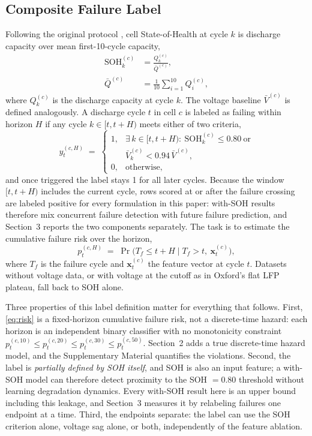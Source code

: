 \documentclass[11pt,a4paper]{article}
\begin{document}
\subsection{Composite Failure Label}
Following the original protocol \cite{shikdar2026learning}, cell State-of-Health at cycle $k$ is discharge capacity over mean first-10-cycle capacity,
\begin{equation}\label{eq:soh}
\begin{aligned}
\mathrm{SOH}_k^{(c)} &= \frac{Q_k^{(c)}}{\bar{Q}^{(c)}},\\[2pt]
\bar{Q}^{(c)} &= \frac{1}{10}\sum_{i=1}^{10} Q_i^{(c)},
\end{aligned}
\end{equation}
where $Q_k^{(c)}$ is the discharge capacity at cycle $k$. The voltage baseline $\bar{V}^{(c)}$ is defined analogously. A discharge cycle $t$ in cell $c$ is labeled as failing within horizon $H$ if any cycle $k\in[t,t{+}H)$ meets either of two criteria,
\begin{equation}\label{eq:label}
y_t^{(c,H)} \;=\; \begin{cases}
1, & \exists\, k\in[t,t{+}H):\ \mathrm{SOH}_k^{(c)}\le 0.80 \ \text{or}\\[2pt]
& \bar{V}_k^{(c)} < 0.94\,\bar{V}^{(c)},\\[2pt]
0, & \text{otherwise,}
\end{cases}
\end{equation}
and once triggered the label stays 1 for all later cycles. Because the window $[t,t{+}H)$ includes the current cycle, rows scored at or after the failure crossing are labeled positive for every formulation in this paper: with-SOH results therefore mix concurrent failure detection with future failure prediction, and Section~3 reports the two components separately. The task is to estimate the cumulative failure risk over the horizon,
\begin{equation}\label{eq:risk}
p_t^{(c,H)} \;=\; \Pr\!\bigl(T_f \le t{+}H \mid T_f > t,\ \mathbf{x}_t^{(c)}\bigr),
\end{equation}
where $T_f$ is the failure cycle and $\mathbf{x}_t^{(c)}$ the feature vector at cycle $t$. Datasets without voltage data, or with voltage at the cutoff as in Oxford's flat LFP plateau, fall back to SOH alone.

Three properties of this label definition matter for everything that follows. First, \eqref{eq:risk} is a fixed-horizon cumulative failure risk, not a discrete-time hazard: each horizon is an independent binary classifier with no monotonicity constraint $p_t^{(c,10)}\le p_t^{(c,20)}\le p_t^{(c,30)}\le p_t^{(c,50)}$. Section~2 adds a true discrete-time hazard model, and the Supplementary Material quantifies the violations. Second, the label is \emph{partially defined by SOH itself}, and SOH is also an input feature; a with-SOH model can therefore detect proximity to the SOH $=0.80$ threshold without learning degradation dynamics. Every with-SOH result here is an upper bound including this leakage, and Section~3 measures it by relabeling failures one endpoint at a time. Third, the endpoints separate: the label can use the SOH criterion alone, voltage sag alone, or both, independently of the feature ablation.
\end{document}
